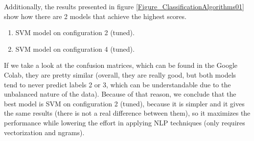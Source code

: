 \hspace{1em}

\noindent
Additionally, the results presented in figure \ref{Figure_ClassificationAlgorithms01} show how there are 2 models that achieve the highest scores.

\begin{enumerate}
    \item SVM model on configuration 2 (tuned).
    \item SVM model on configuration 4 (tuned).
\end{enumerate}

If we take a look at the confusion matrices, which can be found in the Google Colab, they are pretty similar (overall, they are really good, but both models tend to never predict labels 2 or 3, which can be understandable due to the unbalanced nature of the data). Because of that reason, we conclude that the best model is SVM on configuration 2 (tuned), because it is simpler and it gives the same results (there is not a real difference between them), so it maximizes the performance while lowering the effort in applying NLP techniques (only requires vectorization and ngrams).